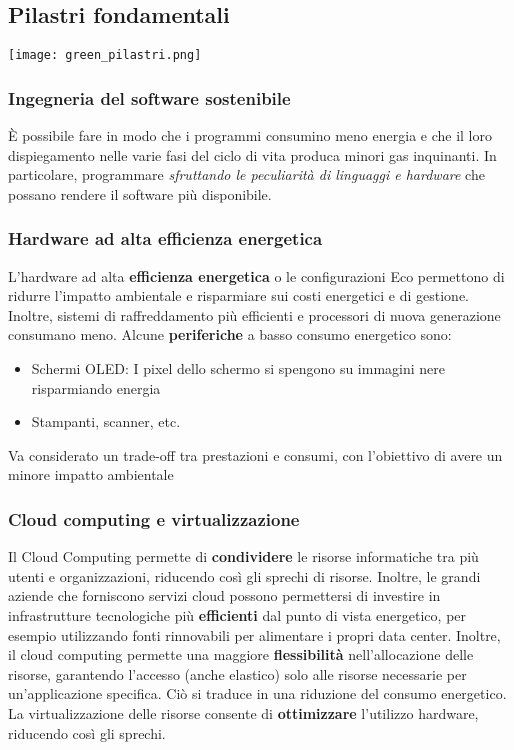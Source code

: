 \subsection{Pilastri fondamentali}
\begin{center}
	\texttt{[image: green\_pilastri.png]}
\end{center}
\subsubsection{Ingegneria del software sostenibile}
È possibile fare in modo che i programmi consumino meno energia e che il loro dispiegamento nelle varie fasi del ciclo di vita produca minori gas inquinanti. In particolare, programmare \emph{sfruttando le peculiarità di linguaggi e hardware} che possano rendere il software più disponibile.
\subsubsection{Hardware ad alta efficienza energetica}
L'hardware ad alta \textbf{efficienza energetica} o le configurazioni Eco permettono di ridurre l'impatto ambientale e risparmiare sui costi energetici e di gestione. Inoltre, sistemi di raffreddamento più efficienti e processori di nuova generazione consumano meno. Alcune \textbf{periferiche} a basso consumo energetico sono:
\begin{itemize}
	\item Schermi OLED:  I pixel dello schermo si spengono su immagini nere risparmiando energia
	\item Stampanti, scanner, etc.
\end{itemize}
Va considerato un trade-off tra prestazioni e consumi, con l'obiettivo di avere un minore impatto ambientale
\subsubsection{Cloud computing e virtualizzazione}
Il Cloud Computing permette di \textbf{condividere} le risorse informatiche tra più utenti e organizzazioni, riducendo così gli sprechi di risorse. Inoltre, le grandi aziende che forniscono servizi cloud possono permettersi di investire in infrastrutture tecnologiche più \textbf{efficienti} dal punto di vista energetico, per esempio utilizzando fonti rinnovabili per alimentare i propri data center. Inoltre, il cloud computing permette una maggiore \textbf{flessibilità} nell'allocazione delle risorse, garantendo l'accesso (anche elastico) solo alle risorse necessarie per un'applicazione specifica. Ciò si traduce in una riduzione del consumo energetico. La virtualizzazione delle risorse consente di \textbf{ottimizzare} l'utilizzo hardware, riducendo così gli sprechi.
